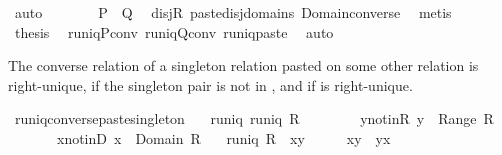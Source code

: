 \begin{isabellebody}
\ auto\isanewline
\ \ \isamarkupfalse%
\ \isamarkupfalse%
\ {\isachardoublequoteopen}{\isasymdots}\ {\isacharequal}\ P{\isasyminverse}\ {\isacharplus}{\isacharasterisk}\ Q{\isasyminverse}{\isachardoublequoteclose}\ \isamarkupfalse%
\ disj{\isacharunderscore}R\ paste{\isacharunderscore}disj{\isacharunderscore}domains\ Domain{\isacharunderscore}converse\ \isamarkupfalse%
\ metis\isanewline
\ \ \isamarkupfalse%
\ \isamarkupfalse%
\ {\isacharquery}thesis\ \isamarkupfalse%
\ runiq{\isacharunderscore}P{\isacharunderscore}conv\ runiq{\isacharunderscore}Q{\isacharunderscore}conv\ runiq{\isacharunderscore}paste{}\ \isamarkupfalse%
\ auto\isanewline
{}\isamarkupfalse%
%
\endisatagproof
{\isafoldproof}%
%
\isadelimproof
%
\endisadelimproof
%
\begin{isamarkuptext}%
The converse relation of a singleton relation pasted on some other relation  is right-unique,
  if the singleton pair is not in , and if  is right-unique.%
\end{isamarkuptext}%
\isamarkuptrue%
\isamarkupfalse%
\ runiq{\isacharunderscore}converse{\isacharunderscore}paste{\isacharunderscore}singleton{\isacharcolon}\isanewline
\ \ \ runiq{\isacharcolon}\ {\isachardoublequoteopen}runiq\ {\isacharparenleft}R{\isasyminverse}{\isacharparenright}{\isachardoublequoteclose}\ \isanewline
\ \ \ \ \ \ \ y{\isacharunderscore}notin{\isacharunderscore}R{\isacharcolon}\ {\isachardoublequoteopen}y\ {\isasymnotin}\ Range\ R{\isachardoublequoteclose}\isanewline
\ \ \ \ \ \ \ x{\isacharunderscore}notin{\isacharunderscore}D{\isacharcolon}\ {\isachardoublequoteopen}x\ {\isasymnotin}\ Domain\ R{\isachardoublequoteclose}\isanewline
\ \ \ {\isachardoublequoteopen}runiq\ {\isacharparenleft}{\isacharparenleft}R\ {\isacharplus}{\isacharasterisk}\ {\isacharbraceleft}{\isacharparenleft}x{\isacharcomma}y{\isacharparenright}{\isacharbraceright}{\isacharparenright}{\isasyminverse}{\isacharparenright}{\isachardoublequoteclose}\isanewline
%
\isadelimproof
%
\endisadelimproof
%
\isatagproof
{}\isamarkupfalse%
\ {\isacharminus}\isanewline
\ \ \isamarkupfalse%
\ {\isachardoublequoteopen}{\isacharbraceleft}{\isacharparenleft}x{\isacharcomma}y{\isacharparenright}{\isacharbraceright}{\isasyminverse}\ {\isacharequal}\ {\isacharbraceleft}{\isacharparenleft}y{\isacharcomma}x{\isacharparenright}{\isacharbraceright}{\isachardoublequoteclose}\ \isamarkupfalse%

\end{isabellebody}
